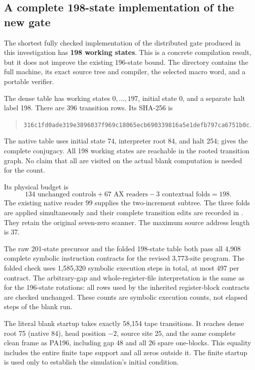 \subsection{A complete 198-state implementation of the new gate}
\label{sec:distributed-machine}

The shortest fully checked implementation of the distributed gate produced
in this investigation has \textbf{198 working states}. This is a concrete
compilation result, but it does not improve the existing 196-state bound.
The directory  contains the full machine, its exact
source tree and compiler, the selected macro word, and a portable verifier.

The dense table  has working states
$0,\ldots,197$, initial state 0, and a separate halt label 198. There are
396 transition rows. Its SHA-256 is
\begin{quote}\small
\nolinkurl{316c1fd0ade319e3896037f969c18065ecb690339816a5e1defb797ca6751b0c}.
\end{quote}
The native table uses initial state 74, interpreter root 84, and halt 254;
 gives the complete conjugacy. All 198 working states
are reachable in the rooted transition graph. No claim that all are visited
on the actual blank computation is needed for the count.

Its physical budget is
\[
 134\text{ unchanged controls}+67\text{ AX readers}
        -3\text{ contextual folds}=198.
\]
The existing native reader 99 supplies the two-increment subtree. The three
folds are applied simultaneously and their complete transition edits are
recorded in . They retain the original seven-zero scanner.
The maximum source address length is 37.

The raw 201-state precursor and the folded 198-state table both pass all
4,908 complete symbolic instruction contracts for the revised 3,773-site
program. The folded check uses 1,585,320 symbolic execution steps in total,
at most 497 per contract. The arbitrary-gap and whole-register-file
interpretation is the same as for the 196-state rotations: all rows used
by the inherited register-block contracts are checked unchanged. These
counts are symbolic execution counts, not elapsed steps of the blank run.

The literal blank startup takes exactly 58,154 tape transitions. It reaches
dense root 75 (native 84), head position $-2$, source site 25, and the same
complete clean frame as PA196, including gap 48 and all 26 spare one-blocks.
This equality includes the entire finite tape support and all zeros outside
it. The finite startup is used only to establish the simulation's initial
condition.

